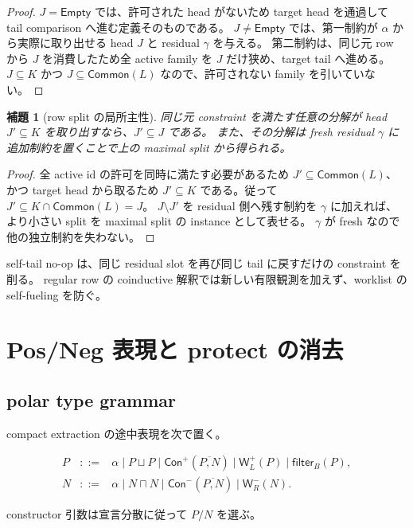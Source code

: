 \documentclass[uplatex,dvipdfmx,a4paper,10.5pt]{jsarticle}
\theoremstyle{jpplain}
\newtheorem{lemma}[definition]{補題}
\newcommand{\Empty}{\mathsf{Empty}}
\newcommand{\Common}{\mathsf{Common}}
\newcommand{\Filter}[2]{\mathsf{filter}_{#1}(#2)}
\newcommand{\PWeight}[2]{\mathsf{W}^{+}_{#1}(#2)}
\newcommand{\NWeight}[2]{\mathsf{W}^{-}_{#1}(#2)}
\newcommand{\kw}[1]{\mathsf{#1}}
\begin{document}
\begin{proof}
$J=\Empty$ では、許可された head がないため target head を通過して tail comparison へ進む定義そのものである。
$J\neq\Empty$ では、第一制約が $\alpha$ から実際に取り出せる head $J$ と residual $\gamma$ を与える。
第二制約は、同じ元 row から $J$ を消費したため全 active family を $J$ だけ狭め、target tail へ進める。
$J\subseteq K$ かつ $J\subseteq\Common(L)$ なので、許可されない family を引いていない。
\end{proof}

\begin{lemma}[row split の局所主性]
同じ元 constraint を満たす任意の分解が head $J'\subseteq K$ を取り出すなら、$J'\subseteq J$ である。
また、その分解は fresh residual $\gamma$ に追加制約を置くことで上の maximal split から得られる。
\end{lemma}

\begin{proof}
全 active id の許可を同時に満たす必要があるため $J'\subseteq\Common(L)$、かつ target head から取るため
$J'\subseteq K$ である。従って $J'\subseteq K\cap\Common(L)=J$。
$J\setminus J'$ を residual 側へ残す制約を $\gamma$ に加えれば、より小さい split を maximal split の instance として表せる。
$\gamma$ が fresh なので他の独立制約を失わない。
\end{proof}

self-tail no-op は、同じ residual slot を再び同じ tail に戻すだけの constraint を削る。
regular row の coinductive 解釈では新しい有限観測を加えず、worklist の self-fueling を防ぐ。

\section{Pos/Neg 表現と protect の消去}

\subsection{polar type grammar}

compact extraction の途中表現を次で置く。

\[
\begin{array}{rcl}
P &::=& \alpha \mid P\sqcup P \mid \kw{Con}^{+}(\overline{P,N})
       \mid \PWeight{L}{P} \mid \Filter{B}{P},\\
N &::=& \alpha \mid N\sqcap N \mid \kw{Con}^{-}(\overline{P,N})
       \mid \NWeight{R}{N}.
\end{array}
\]

constructor 引数は宣言分散に従って $P/N$ を選ぶ。
\end{document}
